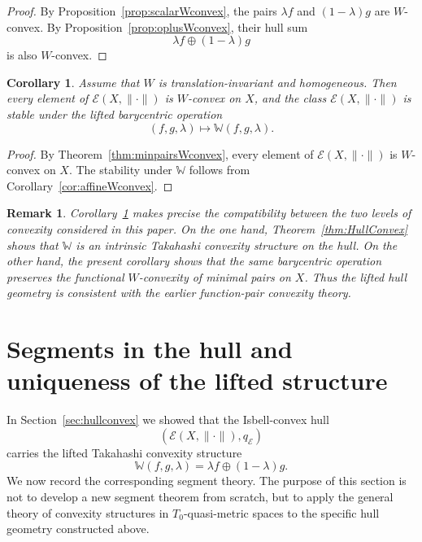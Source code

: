\documentclass[preprint,12pt]{elsarticle}
\numberwithin{equation}{section}
\newtheorem{corollary}[theorem]{Corollary}
\newtheorem{remark}[theorem]{Remark}
\newcommand{\E}{\mathcal{E}}
\begin{document}
\begin{proof}
By Proposition~\ref{prop:scalarWconvex}, the pairs \(\lambda f\) and
\((1-\lambda)g\) are \(W\)-convex.  By
Proposition~\ref{prop:oplusWconvex}, their hull sum
\[
\lambda f\oplus(1-\lambda)g
\]
is also \(W\)-convex.
\end{proof}

\begin{corollary}\label{cor:allminimalstable}
Assume that \(W\) is translation-invariant and homogeneous.  Then every
element of \(\E(X,\|\cdot\|)\) is \(W\)-convex on \(X\), and the class
\(\E(X,\|\cdot\|)\) is stable under the lifted barycentric operation
\[
(f,g,\lambda)\longmapsto \mathbb W(f,g,\lambda).
\]
\end{corollary}

\begin{proof}
By Theorem~\ref{thm:minpairsWconvex}, every element of
\(\E(X,\|\cdot\|)\) is \(W\)-convex on \(X\).  The stability under
\(\mathbb W\) follows from Corollary~\ref{cor:affineWconvex}.
\end{proof}

\begin{remark}\label{rem:two-level-compatibility}
Corollary~\ref{cor:allminimalstable} makes precise the compatibility between
the two levels of convexity considered in this paper.  On the one hand,
Theorem~\ref{thm:HullConvex} shows that \(\mathbb W\) is an intrinsic
Takahashi convexity structure on the hull.  On the other hand, the present
corollary shows that the same barycentric operation preserves the functional
\(W\)-convexity of minimal pairs on \(X\).  Thus the lifted hull geometry is
consistent with the earlier function-pair convexity theory.
\end{remark}




\section{Segments in the hull and uniqueness of the lifted structure}
\label{sec:segments}

In Section~\ref{sec:hullconvex} we showed that the Isbell-convex hull
\[
(\E(X,\|\cdot\|),q_{\E})
\]
carries the lifted Takahashi convexity structure
\[
\mathbb W(f,g,\lambda)=\lambda f\oplus(1-\lambda)g.
\]
We now record the corresponding segment theory.  The purpose of this section is
not to develop a new segment theorem from scratch, but to apply the general
theory of convexity structures in \(T_0\)-quasi-metric spaces to the specific
hull geometry constructed above.
\end{document}
